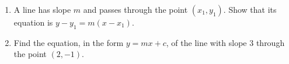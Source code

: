 \begin{enumerate}
\item[(a)] A line has slope $m$ and passes through the point $(x_1,y_1)$. Show that its equation is $y-y_1=m(x-x_1)$.
\item[(b)] Find the equation, in the form $y=mx+c$, of the line with slope $3$ through the point $(2,-1)$.
\end{enumerate}
